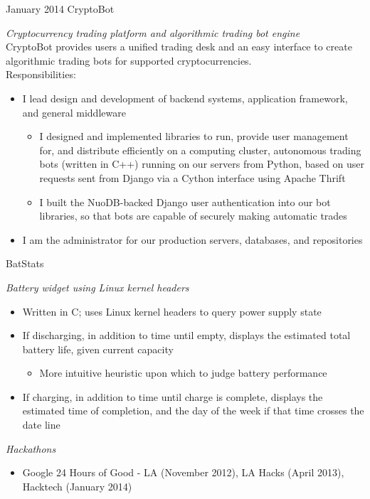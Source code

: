 \documentclass[]{mills-cv} %
\begin{document}
\begin{entrylist}
\entry
{January 2014}
{CryptoBot}
{}
{\emph{Cryptocurrency trading platform and algorithmic trading bot engine} \\
CryptoBot provides users a unified trading desk and an easy interface to create algorithmic trading bots for supported cryptocurrencies. \\
Responsibilities:
\begin{itemize}
\item I lead design and development of backend systems, application framework, and general middleware
\begin{itemize}
\item I designed and implemented libraries to run, provide user management for, and distribute efficiently on a computing cluster, autonomous trading bots (written in C++) running on our servers from Python, based on user requests sent from Django via a Cython interface using Apache Thrift
\item I built the NuoDB-backed Django user authentication into our bot libraries, so that bots are capable of securely making automatic trades
\end{itemize}
\item I am the administrator for our production servers, databases, and repositories
\end{itemize}
}

\entry
{}
{BatStats}
{}
{\emph{Battery widget using Linux kernel headers}
\begin{itemize}
\item Written in C; uses Linux kernel headers to query power supply state
\item If discharging, in addition to time until empty, displays the estimated total battery life, given current capacity
\begin{itemize}
\item More intuitive heuristic upon which to judge battery performance
\end{itemize}
\item If charging, in addition to time until charge is complete, displays the estimated time of completion, and the day of the week if that time crosses the date line
\end{itemize}
\emph{Hackathons}
\begin{itemize}
\item Google 24 Hours of Good - LA (November 2012), LA Hacks (April 2013), \\ Hacktech (January 2014)
\end{itemize}}
\end{entrylist}
\end{document}
